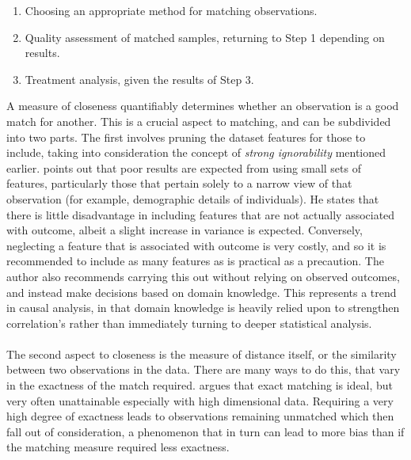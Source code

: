 {{\begin {enumerate}
\item{Choosing an appropriate method for matching observations.}
\item{Quality assessment of matched samples, returning to Step 1 depending on results.}
\item{Treatment analysis, given the results of Step 3.}
\end{enumerate}
A measure of closeness quantifiably determines whether an observation is a good match for another. This is a crucial aspect to matching, and can be subdivided into two parts. The first involves pruning the dataset features for those to include, taking into consideration the concept of {\it strong ignorability} mentioned earlier. \cite{stuart2010matching} points out that poor results are expected from using small sets of features, particularly those that pertain solely to a narrow view of that observation (for example, demographic details of individuals). He states that there is little disadvantage in including features that are not actually associated with outcome, albeit a slight increase in variance is expected. Conversely, neglecting a feature that is associated with outcome is very costly, and so it is recommended to include as many features as is practical as a precaution. The author also recommends carrying this out without relying on observed outcomes, and instead make decisions based on domain knowledge. This represents a trend in causal analysis, in that domain knowledge is heavily relied upon to strengthen correlation's rather than immediately turning to deeper statistical analysis. \\\\
The second aspect to closeness is the measure of distance itself, or the similarity between two observations in the data. There are many ways to do this, that vary in the exactness of the match required. \cite{stuart2010matching} argues that exact matching is ideal, but very often unattainable especially with high dimensional data. Requiring a very high degree of exactness leads to observations remaining unmatched which then fall out of consideration, a phenomenon that in turn can lead to more bias than if the matching measure required less exactness. 
\\\\ 
}}
